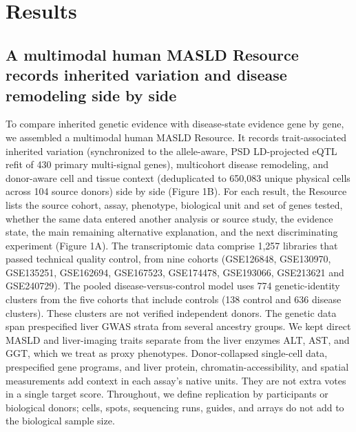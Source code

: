 \section{Results}\label{results}

\subsection{A multimodal human MASLD Resource records inherited variation and disease remodeling side by side}\label{a-multimodal-human-masld-resource-records-inherited-variation-and-disease-remodeling-side-by-side}

To compare inherited genetic evidence with disease-state evidence gene by gene, we assembled a multimodal human MASLD Resource. It records trait-associated inherited variation (synchronized to the allele-aware, PSD LD-projected eQTL refit of 430 primary multi-signal genes), multicohort disease remodeling, and donor-aware cell and tissue context (deduplicated to 650,083 unique physical cells across 104 source donors) side by side (Figure 1B). For each result, the Resource lists the source cohort, assay, phenotype, biological unit and set of genes tested, whether the same data entered another analysis or source study, the evidence state, the main remaining alternative explanation, and the next discriminating experiment (Figure 1A). The transcriptomic data comprise 1,257 libraries that passed technical quality control, from nine cohorts (GSE126848, GSE130970, GSE135251, GSE162694, GSE167523, GSE174478, GSE193066, GSE213621 and GSE240729). The pooled disease-versus-control model uses 774 genetic-identity clusters from the five cohorts that include controls (138 control and 636 disease clusters). These clusters are not verified independent donors. The genetic data span prespecified liver GWAS strata from several ancestry groups. We kept direct MASLD and liver-imaging traits separate from the liver enzymes ALT, AST, and GGT, which we treat as proxy phenotypes. Donor-collapsed single-cell data, prespecified gene programs, and liver protein, chromatin-accessibility, and spatial measurements add context in each assay's native units. They are not extra votes in a single target score. Throughout, we define replication by participants or biological donors; cells, spots, sequencing runs, guides, and arrays do not add to the biological sample size.



